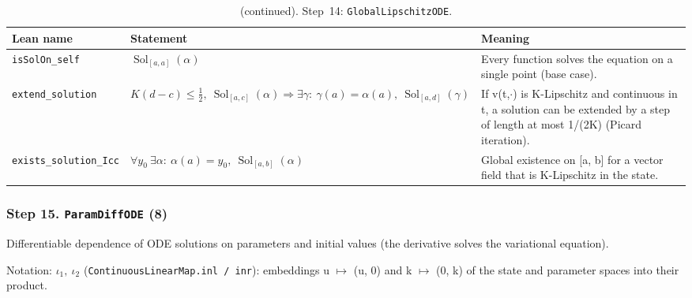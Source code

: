 \addtocounter{table}{-1}
{\small
\begin{longtable}{@{}>{\raggedright\arraybackslash}p{3.6cm}>{\raggedright\arraybackslash}p{6.6cm}>{\raggedright\arraybackslash}p{5.6cm}@{}}
\caption[]{(continued). Step~14: \texttt{GlobalLipschitzODE}.}\\
\toprule
Lean name & Statement & Meaning \\
\midrule
\endhead
\texttt{isSolOn\_\allowbreak{}self} & $\displaystyle \operatorname{Sol}_{[a,a]}(\alpha)$ & Every function solves the equation on a single point (base case). \\[3pt]
\texttt{extend\_\allowbreak{}solution} & $\displaystyle K(d-c)\le\tfrac12,\ \operatorname{Sol}_{[a,c]}(\alpha)\Rightarrow\exists\gamma:\ \gamma(a)=\alpha(a),\ \operatorname{Sol}_{[a,d]}(\gamma)$ & If v(t,$\cdot$) is K-Lipschitz and continuous in t, a solution can be extended by a step of length at most 1/(2K) (Picard iteration). \\[3pt]
\texttt{exists\_\allowbreak{}solution\_\allowbreak{}Icc} & $\displaystyle \forall y_0\ \exists\alpha:\ \alpha(a)=y_0,\ \operatorname{Sol}_{[a,b]}(\alpha)$ & Global existence on [a, b] for a vector field that is K-Lipschitz in the state. \\[3pt]
\bottomrule
\end{longtable}
}

\subsubsection*{Step 15. \texttt{ParamDiffODE} (8)}
Differentiable dependence of ODE solutions on parameters and initial values (the derivative solves the variational equation).

{\small\raggedright Notation: $\iota_1,\ \iota_2$ (\texttt{ContinuousLinearMap.inl / inr}): embeddings u $\mapsto$ (u, 0) and k $\mapsto$ (0, k) of the state and parameter spaces into their product.}


